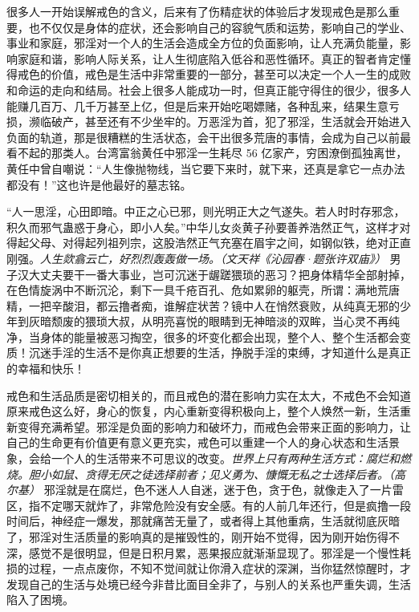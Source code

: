很多人一开始误解戒色的含义，后来有了伤精症状的体验后才发现戒色是那么重要，也不仅仅是身体的症状，还会影响自己的容貌气质和运势，影响自己的学业、事业和家庭，邪淫对一个人的生活会造成全方位的负面影响，让人充满负能量，影响家庭和谐，影响人际关系，让人生彻底陷入低谷和恶性循环。真正的智者肯定懂得戒色的价值，戒色是生活中非常重要的一部分，甚至可以决定一个人一生的成败和命运的走向和结局。社会上很多人能成功一时，但真正能守得住的很少，很多人能赚几百万、几千万甚至上亿，但是后来开始吃喝嫖赌，各种乱来，结果生意亏损，濒临破产，甚至还有不少坐牢的。万恶淫为首，犯了邪淫，生活就会开始进入负面的轨道，那是很糟糕的生活状态，会干出很多荒唐的事情，会成为自己以前最看不起的那类人。台湾富翁黄任中邪淫一生耗尽 56 亿家产，穷困潦倒孤独离世，黄任中曾自嘲说：“人生像抛物线，当它要下来时，就下来，还真是拿它一点办法都没有！”这也许是他最好的墓志铭。

“人一思淫，心田即暗。中正之心已邪，则光明正大之气遂失。若人时时存邪念，积久而邪气蛊惑于身心，即小人矣。”中华儿女炎黄子孙要善养浩然正气，这样才对得起父母、对得起列祖列宗，这股浩然正气充塞在眉宇之间，如钢似铁，绝对正直刚强。\textit{人生欻翕云亡，好烈烈轰轰做一场。（文天祥《沁园春·题张许双庙》）} 男子汉大丈夫要干一番大事业，岂可沉迷于龌蹉猥琐的恶习？把身体精华全部射掉，在色情旋涡中不断沉沦，剩下一具千疮百孔、危如累卵的躯壳，所谓：满地荒唐精，一把辛酸泪，都云撸者痴，谁解症状苦？镜中人在悄然衰败，从纯真无邪的少年到灰暗颓废的猥琐大叔，从明亮喜悦的眼睛到无神暗淡的双眸，当心灵不再纯净，当身体的能量被恶习掏空，很多的坏变化都会出现，整个人、整个生活都会变质！沉迷手淫的生活不是你真正想要的生活，挣脱手淫的束缚，才知道什么是真正的幸福和快乐！

戒色和生活品质是密切相关的，而且戒色的潜在影响力实在太大，不戒色不会知道原来戒色这么好，身心的恢复，内心重新变得积极向上，整个人焕然一新，生活重新变得充满希望。邪淫是负面的影响力和破坏力，而戒色会带来正面的影响力，让自己的生命更有价值更有意义更充实，戒色可以重建一个人的身心状态和生活景象，会给一个人的生活带来不可思议的改变。\textit{世界上只有两种生活方式：腐烂和燃烧。胆小如鼠、贪得无厌之徒选择前者；见义勇为、慷慨无私之士选择后者。（高尔基）} 邪淫就是在腐烂，色不迷人人自迷，迷于色，贪于色，就像走入了一片雷区，指不定哪天就炸了，非常危险没有安全感。有的人前几年还行，但是疯撸一段时间后，神经症一爆发，那就痛苦无量了，或者得上其他重病，生活就彻底灰暗了，邪淫对生活质量的影响真的是摧毁性的，刚开始不觉得，因为刚开始伤得不深，感觉不是很明显，但是日积月累，恶果报应就渐渐显现了。邪淫是一个慢性耗损的过程，一点点废你，不知不觉间就让你滑入症状的深渊，当你猛然惊醒时，才发现自己的生活与处境已经今非昔比面目全非了，与别人的关系也严重失调，生活陷入了困境。

